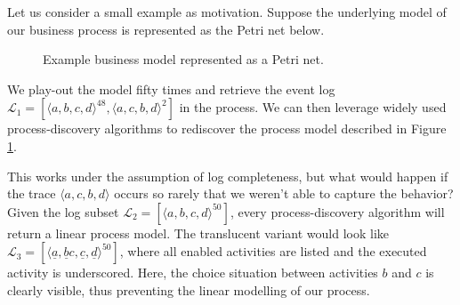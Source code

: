 Let us consider a small example as motivation. Suppose the underlying model of our business process is represented as the Petri net below.

\begin{figure}[h]
    \centering
\caption{Example business model represented as a Petri net.}
\label{petrinet}

\end{figure}

We play-out the model fifty times and retrieve the event log $\mathcal{L}_1 = [ \langle a, b, c, d \rangle ^{48}, \langle a, c, b, d \rangle^2 ]$ in the process. We can then leverage widely used process-discovery algorithms to rediscover the process model described in Figure \ref{petrinet}. 

This works under the assumption of log completeness, but what would happen if the trace $\langle a, c, b, d \rangle$ occurs so rarely that we weren't able to capture the behavior? Given the log subset $\mathcal{L}_2 = [ \langle a, b, c, d \rangle ^{50}]$, every process-discovery algorithm will return a linear process model. The translucent variant would look like $\mathcal{L}_3 = [ \langle \underline{a}, \underline{b}c,  \underline{c},  \underline{d} \rangle ^{50}]$, where all enabled activities are listed and the executed activity is underscored. Here, the choice situation between activities $b$ and $c$ is clearly visible, thus preventing the linear modelling of our process.

